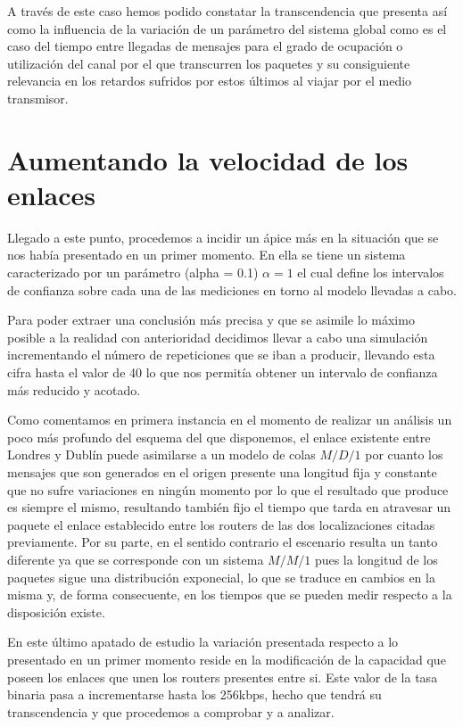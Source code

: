 \documentclass{article}[10pt]
\begin{document}
		A través de este caso hemos podido constatar la transcendencia que presenta así como la influencia de la variación de un parámetro del sistema global como es el caso del tiempo entre llegadas de mensajes para el grado de ocupación o utilización del canal por el que transcurren los paquetes y su consiguiente relevancia en los retardos sufridos por estos últimos al viajar por el medio transmisor.

	\section{Aumentando la velocidad de los enlaces}
		Llegado a este punto, procedemos a incidir un ápice más en la situación que se nos había presentado en un primer momento. En ella se tiene un sistema caracterizado por un parámetro (alpha = 0.1) $\alpha = 1$ el cual define los intervalos de confianza sobre cada una de las mediciones en torno al modelo llevadas a cabo.

		Para poder extraer una conclusión más precisa y que se asimile lo máximo posible a la realidad con anterioridad decidimos llevar a cabo una simulación incrementando el número de repeticiones que se iban a producir, llevando esta cifra hasta el valor de 40 lo que nos permitía obtener un intervalo de confianza más reducido y acotado.

		Como comentamos en primera instancia en el momento de realizar un análisis un poco más profundo del esquema del que disponemos, el enlace existente entre Londres y Dublín puede asimilarse a un modelo de colas $M/D/1$ por cuanto los mensajes que son generados en el origen presente una longitud fija y constante que no sufre variaciones en ningún momento por lo que el resultado que produce es siempre el mismo, resultando también fijo el tiempo que tarda en atravesar un paquete el enlace establecido entre los routers de las dos localizaciones citadas previamente. Por su parte, en el sentido contrario el escenario resulta un tanto diferente ya que se corresponde con un sistema $M/M/1$ pues la longitud de los paquetes sigue una distribución exponecial, lo que se traduce en cambios en la misma y, de forma consecuente, en los tiempos que se pueden medir respecto a la disposición existe.

		En este último apatado de estudio la variación presentada respecto a lo presentado en un primer momento reside en la modificación de la capacidad que poseen los enlaces que unen los routers presentes entre si. Este valor de la tasa binaria pasa a incrementarse hasta los 256kbps, hecho que tendrá su transcendencia y que procedemos a comprobar y a analizar.
\end{document}
